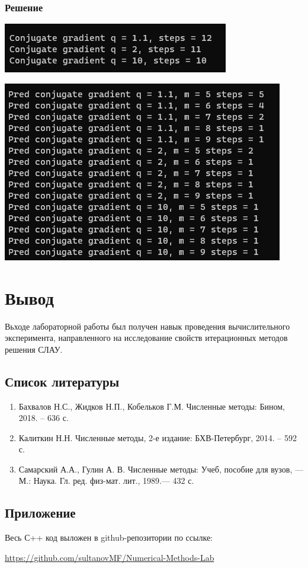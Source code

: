 \documentclass[a4paper, fontsize=14pt]{article}
\begin{document}
\subsubsection*{Решение}

\begin{center}
    \includegraphics[]{src/conjugate}
    \label{fig:conjugate}
\end{center}
\begin{center}
    \includegraphics[]{src/predconj.png}
    \label{fig:conjugate}
\end{center}    \newpage
\section*{{Вывод}}
Вьходе лабораторной работы был получен навык проведения вычислительного
эксперимента, направленного на исследование свойств итерационных методов
решения СЛАУ.
\newpage
\subsection*{Список литературы}
\begin{enumerate}
    \item Бахвалов Н.С., Жидков Н.П., Кобельков Г.М. Численные методы: Бином, 2018. – 636 с. 
    \item Калиткин Н.Н. Численные методы, 2-е издание: БХВ-Петербург, 2014. – 592 с.
    \item Самарский А.А., Гулин А. В. Численные методы: Учеб, пособие для вузов, — М.: Наука. Гл. ред. физ-мат. лит., 1989.— 432 с.
\end{enumerate}
\newpage
\subsection*{Приложение}
Весь С++ код выложен в github-репозитории по ссылке: 

\url{https://github.com/sultanovMF/Numerical-Methods-Lab}
\end{document}
